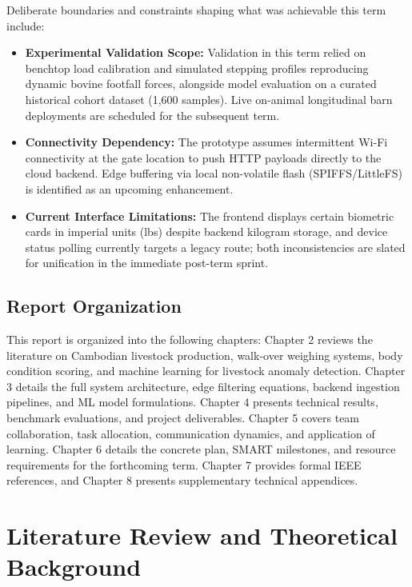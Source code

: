 \documentclass[11pt,a4paper]{report}
\begin{document}
Deliberate boundaries and constraints shaping what was achievable this term include:
\begin{itemize}
    \item \textbf{Experimental Validation Scope:} Validation in this term relied on benchtop load calibration and simulated stepping profiles reproducing dynamic bovine footfall forces, alongside model evaluation on a curated historical cohort dataset (1,600 samples). Live on-animal longitudinal barn deployments are scheduled for the subsequent term.
    \item \textbf{Connectivity Dependency:} The prototype assumes intermittent Wi-Fi connectivity at the gate location to push HTTP payloads directly to the cloud backend. Edge buffering via local non-volatile flash (SPIFFS/LittleFS) is identified as an upcoming enhancement.
    \item \textbf{Current Interface Limitations:} The frontend displays certain biometric cards in imperial units (lbs) despite backend kilogram storage, and device status polling currently targets a legacy route; both inconsistencies are slated for unification in the immediate post-term sprint.
\end{itemize}

\section{Report Organization}
This report is organized into the following chapters: Chapter 2 reviews the literature on Cambodian livestock production, walk-over weighing systems, body condition scoring, and machine learning for livestock anomaly detection. Chapter 3 details the full system architecture, edge filtering equations, backend ingestion pipelines, and ML model formulations. Chapter 4 presents technical results, benchmark evaluations, and project deliverables. Chapter 5 covers team collaboration, task allocation, communication dynamics, and application of learning. Chapter 6 details the concrete plan, SMART milestones, and resource requirements for the forthcoming term. Chapter 7 provides formal IEEE references, and Chapter 8 presents supplementary technical appendices.

\clearpage

\chapter{Literature Review and Theoretical Background}
\end{document}
